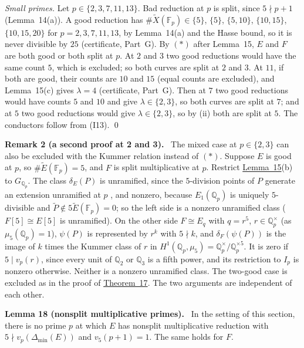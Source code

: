 \documentclass[11pt]{article}
\newenvironment{statement}[1]{\par\medskip\noindent\phantomsection\textbf{#1}\ }{\par\medskip}
\newcommand{\Q}{\mathbb Q}
\newcommand{\F}{\mathbb F}
\begin{document}
\emph{Small primes.} Let \(p\in\{2,3,7,11,13\}\). Bad reduction at \(p\) is split, since \(5\nmid p+1\)
(Lemma~14(a)). A good reduction has \(\#\widetilde X(\F_p)\in\{5\}\), \(\{5\}\), \(\{5,10\}\), \(\{10,15\}\),
\(\{10,15,20\}\) for \(p=2,3,7,11,13\), by Lemma~14(a) and the Hasse bound, so it is never divisible by \(25\)
(certificate, Part~G). By \((\ast)\) after Lemma~15, \(E\) and \(F\) are both good or both split at \(p\). At \(2\)
and \(3\) two good reductions would have the same count \(5\), which is excluded; so both curves are split at \(2\)
and \(3\). At \(11\), if both are good, their counts are \(10\) and \(15\) (equal counts are excluded), and
Lemma~15(c) gives \(\lambda=4\) (certificate, Part~G). Then at \(7\) two good reductions would have counts \(5\) and
\(10\) and give \(\lambda\in\{2,3\}\), so both curves are split at \(7\); and at \(5\) two good reductions would give
\(\lambda\in\{2,3\}\), so by (ii) both are split at \(5\). The conductors follow from (I13). \qed

\begin{statement}{Remark 2 (a second proof at 2 and 3).}\label{rem-route}
The mixed case at \(p\in\{2,3\}\) can also be excluded with the Kummer relation instead of \((\ast)\). Suppose \(E\)
is good at \(p\), so \(\#\widetilde E(\F_p)=5\), and \(F\) is split multiplicative at \(p\). Restrict
\hyperref[lemma-kummer]{Lemma~15}(b) to \(G_{\Q_p}\). The class \(\delta_E(P)\) is unramified, since the
\(5\)-division points of \(P\) generate an extension unramified at \(p\) \cite[Proposition~VIII.1.5(b)]{Si1}, and
nonzero, because \(E_1(\Q_p)\) is uniquely \(5\)-divisible and \(\widetilde P\notin5\widetilde E(\F_p)=0\); so
the left side is a nonzero unramified class (\(F[5]\cong E[5]\) is unramified). On the other side \(F\cong E_q\) with
\(q=r^5\), \(r\in\Q_p^\times\) (as \(\mu_5(\Q_p)=1\)), \(\psi(P)\) is represented by \(r^k\) with \(5\nmid k\), and
\(\delta_F(\psi(P))\) is the image of \(k\) times the Kummer class of \(r\) in \(H^1(\Q_p,\mu_5)=
\Q_p^\times/\Q_p^{\times5}\). It is zero if \(5\mid v_p(r)\), since every unit of \(\Q_2\) or \(\Q_3\) is a fifth
power, and its restriction to \(I_p\) is nonzero otherwise. Neither is a nonzero unramified class. The two-good case
is excluded as in the proof of \hyperref[thm-25]{Theorem~17}. The two arguments are independent of each
other.
\end{statement}

\begin{statement}{Lemma 18 (nonsplit multiplicative primes).}\label{lemma-nonsplit}
In the setting of this section, there is no prime \(p\) at which \(E\) has nonsplit multiplicative reduction with
\(5\nmid v_p(\Delta_{\min}(E))\) and \(v_5(p+1)=1\). The same holds for \(F\).
\end{statement}
\end{document}
